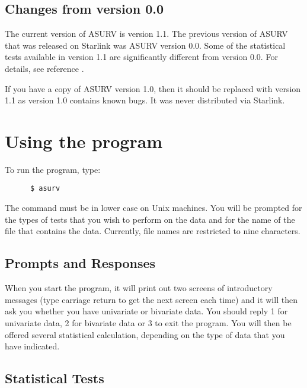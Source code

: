 \subsection{Changes from version 0.0}

The current version of ASURV is version 1.1. The previous version of ASURV that
was released on Starlink was ASURV version 0.0. Some of the statistical tests
available in version 1.1 are significantly different from version 0.0. For
details, see reference \cite{mud-1}.

If you have a copy of ASURV version 1.0, then it should be replaced with
version 1.1 as version 1.0 contains known bugs. It was never distributed via
Starlink.

\section {Using the program}

To run the program, type:

\begin{verbatim}
      $ asurv
\end{verbatim}

The command must be in lower case on Unix machines. You will be prompted for
the types of tests that you wish to perform on the data and for the name of the
file that contains the data. Currently, file names are restricted to nine
characters.

\subsection {Prompts and Responses}

When you start the program, it will print out two screens of introductory
messages (type carriage return to get the next screen each time) and it will
then ask you whether you have univariate or bivariate data. You should reply 1
for univariate data, 2 for bivariate data or 3 to exit the program. You will
then be offered several statistical calculation, depending on the type of data
that you have indicated.

\subsection {Statistical Tests}

